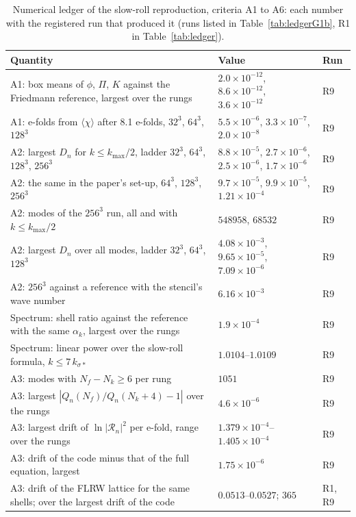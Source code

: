 \begin{table}
\caption{\label{tab:ledgerG1}Numerical ledger of the slow-roll reproduction, criteria A1 to A6: each number with the registered run that produced it (runs listed in Table~\ref{tab:ledgerG1b}, R1 in Table~\ref{tab:ledger}).}
\begin{ruledtabular}
\footnotesize
\begin{tabular}{p{}p{}p{}}
Quantity & Value & Run \\
\hline
A1: box means of $\phi$, $\Pi$, $K$ against the Friedmann reference, largest over the rungs & $2.0\times10^{-12}$, $8.6\times10^{-12}$, $3.6\times10^{-12}$ & R9 \\
A1: e-folds from $\langle\chi\rangle$ after 8.1 e-folds, $32^3$, $64^3$, $128^3$ & $5.5\times10^{-6}$, $3.3\times10^{-7}$, $2.0\times10^{-8}$ & R9 \\
A2: largest $D_n$ for $k\leq k_\mathrm{max}/2$, ladder $32^3$, $64^3$, $128^3$, $256^3$ & $8.8\times10^{-5}$, $2.7\times10^{-6}$, $2.5\times10^{-6}$, $1.7\times10^{-6}$ & R9 \\
A2: the same in the paper's set-up, $64^3$, $128^3$, $256^3$ & $9.7\times10^{-5}$, $9.9\times10^{-5}$, $1.21\times10^{-4}$ & R9 \\
A2: modes of the $256^3$ run, all and with $k\leq k_\mathrm{max}/2$ & $548958$, $68532$ & R9 \\
A2: largest $D_n$ over all modes, ladder $32^3$, $64^3$, $128^3$ & $4.08\times10^{-3}$, $9.65\times10^{-5}$, $7.09\times10^{-6}$ & R9 \\
A2: $256^3$ against a reference with the stencil's wave number & $6.16\times10^{-3}$ & R9 \\
Spectrum: shell ratio against the reference with the same $\alpha_k$, largest over the rungs & $1.9\times10^{-4}$ & R9 \\
Spectrum: linear power over the slow-roll formula, $k\leq7\,k_{\sigma*}$ & $1.0104$--$1.0109$ & R9 \\
A3: modes with $N_f-N_k\geq6$ per rung & $1051$ & R9 \\
A3: largest $|Q_n(N_f)/Q_n(N_k+4)-1|$ over the rungs & $4.6\times10^{-6}$ & R9 \\
A3: largest drift of $\ln|\mathcal{R}_n|^2$ per e-fold, range over the rungs & $1.379\times10^{-4}$--$1.405\times10^{-4}$ & R9 \\
A3: drift of the code minus that of the full equation, largest & $1.75\times10^{-6}$ & R9 \\
A3: drift of the FLRW lattice for the same shells; over the largest drift of the code & $0.0513$--$0.0527$; $365$ & R1, R9 \\

\end{tabular}
\end{ruledtabular}
\end{table}

